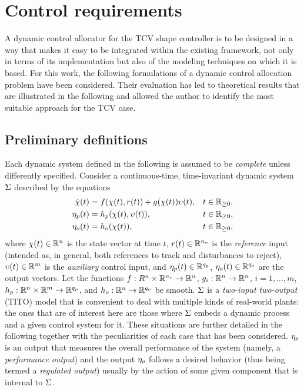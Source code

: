 \section{Control requirements}
\label{sec:all_prbs}
A dynamic control allocator for the TCV shape controller is to be designed in a way that makes it easy to be integrated within the existing framework, not only in terms of its implementation but also of the modeling techniques on which it is based. For this work, the following formulations of a dynamic control allocation problem have been considered. Their evaluation has led to theoretical results that are illustrated in the following and allowed the author to identify the most suitable approach for the TCV case.

\subsection{Preliminary definitions}
\label{sec:defs}
Each dynamic system defined in the following is assumed to be \emph{complete} unless differently specified. Consider a continuous-time, time-invariant dynamic system $\Sigma$ described by the equations
\begin{subequations}
  \label{eq:bbsys}
  \begin{align}
    \dot{\chi}(t) & = f(\chi(t),r(t)) + g(\chi(t))\upsilon(t), & t\in\mathbb{R}_{\geq 0}, \\
    \eta_p(t) & = h_p(\chi(t), \upsilon(t)), & t\in\mathbb{R}_{\geq 0}, \\
    \eta_o(t) & = h_o(\chi(t)), & t\in\mathbb{R}_{\geq 0},
  \end{align}
\end{subequations}
where $\chi(t)\in\mathbb{R}^n$ is the state vector at time $t$, $r(t)\in\mathbb{R}^{{n_r}}$ is the \emph{reference} input (intended as, in general, both references to track and disturbances to reject), $\upsilon(t)\in\mathbb{R}^m$ is the \emph{auxiliary} control input, and $\eta_p(t)\in\mathbb{R}^{{q_p}}$, $\eta_o(t)\in\mathbb{R}^{{q_o}}$ are the output vectors. Let the functions $f : R^{n} \times \mathbb{R}^{{n_r}} \rightarrow \mathbb{R}^n$, $g_i : \mathbb{R}^{n} \rightarrow \mathbb{R}^{n}$, $i = 1, ..., m$, $h_p : \mathbb{R}^{n} \times \mathbb{R}^{m} \rightarrow \mathbb{R}^{{q_p}}$, and $h_o : \mathbb{R}^{n} \rightarrow \mathbb{R}^{{q_o}}$ be smooth. $\Sigma$ is a \emph{two-input two-output} (TITO) model that is convenient to deal with multiple kinds of real-world plants: the ones that are of interest here are those where $\Sigma$ embeds a dynamic process and a given control system for it. These situations are further detailed in the following together with the peculiarities of each case that has been considered. $\eta_p$ is an output that measures the overall performance of the system (namely, a \emph{performance output}) and the output $\eta_o$ follows a desired behavior (thus being termed a \emph{regulated output}) usually by the action of some given component that is internal to $\Sigma$.


